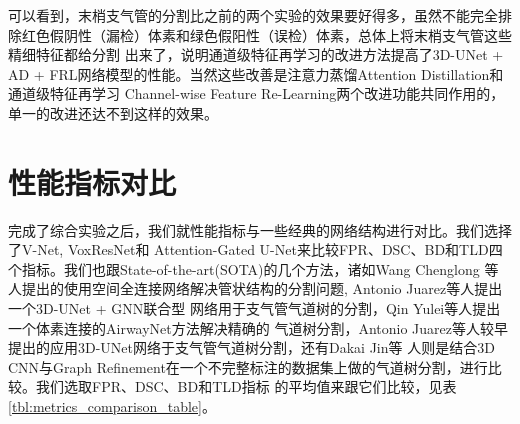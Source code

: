 可以看到，末梢支气管的分割比之前的两个实验的效果要好得多，虽然不能完全排除红色假阴性（漏检）体素和绿色假阳性（误检）体素，总体上将末梢支气管这些精细特征都给分割
出来了，说明通道级特征再学习的改进方法提高了3D-UNet + AD + FRL网络模型的性能。当然这些改善是注意力蒸馏Attention Distillation和通道级特征再学习
Channel-wise Feature Re-Learning两个改进功能共同作用的，单一的改进还达不到这样的效果。


\section{性能指标对比}

完成了综合实验之后，我们就性能指标与一些经典的网络结构进行对比。我们选择了V-Net\cite{Milletar2016VNetFC}, VoxResNet\cite{CHEN2018446}和
Attention-Gated U-Net\cite{Oktay2018AttentionUL}来比较FPR、DSC、BD和TLD四个指标。我们也跟State-of-the-art(SOTA)的几个方法，诸如Wang Chenglong
等人\cite{Wang2019TubularSegment}提出的使用空间全连接网络解决管状结构的分割问题, Antonio Juarez等人提出一个3D-UNet + GNN联合型
网络\cite{Juarez2019Joint3DUNetGraph}用于支气管气道树的分割，Qin Yulei等人\cite{Qin2019AirwayNet}提出一个体素连接的AirwayNet方法解决精确的
气道树分割，Antonio Juarez等人\cite{Juarez2018AutoAirwaySegment}较早提出的应用3D-UNet网络于支气管气道树分割，还有Dakai Jin等
人\cite{Dakai2017GraphRefinement}则是结合3D CNN与Graph Refinement在一个不完整标注的数据集上做的气道树分割，进行比较。我们选取FPR、DSC、BD和TLD指标
的平均值来跟它们比较，见表\ref{tbl:metrics_comparison_table}。
